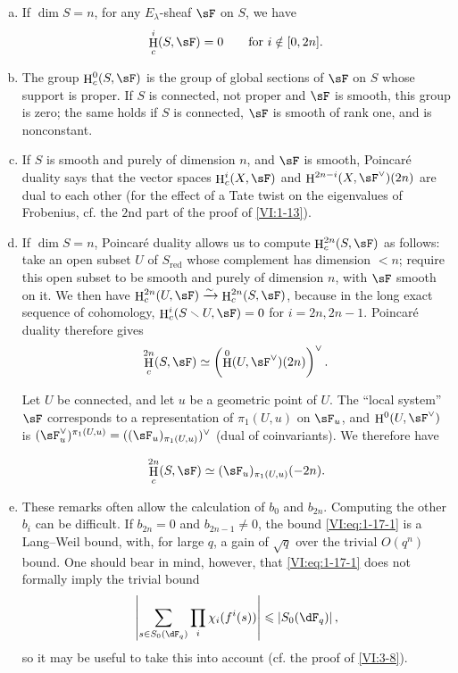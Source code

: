 \documentclass[oneside]{book}
\DeclareMathOperator{\h}{H}
\newcommand{\iso}{\xrightarrow\sim}
\renewcommand{\setminus}{\smallsetminus}
\theoremstyle{sga-source}
\theoremstyle{sga-source-dash}
\theoremstyle{sga-source-dotdash}
\theoremstyle{sga-source-number-note-dash}
\theoremstyle{sga-source-note-number-dotdash}
\theoremstyle{sga-source-example-dotdash}
\theoremstyle{sga-source-inline-number}
\theoremstyle{sga-source-bare-number}
\theoremstyle{sga-source}
\newcommand{\PrintPage}[1]{}\newcommand{\MathPage}[1]{}\newcommand{\PrintCite}[2]{#1}\newcommand{\var}[3]{#1}
\begin{document}
\begin{enumerate}[a)]
  \item If $\dim S=n$, for any $E_\lambda$-sheaf $\sF$ on $S$, we have 
    \[
      \h_c^i(S,\sF) = 0 \qquad \text{for $i\notin [0,2n]$.}
    \]
  \item The group $\h_c^0(S,\sF)$ is the group of global sections of $\sF$ 
    on $S$ whose support is proper. If $S$ is connected, not proper and 
    $\sF$ is smooth, this group is zero; the same holds if $S$ is connected, 
    $\sF$ is smooth of rank one, and is nonconstant.
  \item If $S$ is smooth and purely of dimension $n$, and $\sF$ is smooth, 
    Poincaré duality says that the vector spaces 
    \var{$\h_c^i(X,\sF)$ and $\h^{2n-i}(X,\sF^\vee)(2n)$}{$\h_c^i(S,\sF)$ and $\h^{2n-i}(S,\sF^\vee)(n)$}{S45-SOL-0707} are dual to each other 
    (for the effect of a Tate twist on the eigenvalues of Frobenius, 
    cf. the $2$nd part of the proof of \ref{VI:1-13}).
  \item If $\dim S=n$, Poincaré duality allows us to compute 
    $\h_c^{2n}(S,\sF)$ as follows: take an open subset $U$ of $S_\text{red}$ 
    whose complement has dimension $<n$; require this open subset to be smooth and 
    purely of dimension $n$, with $\sF$ smooth on it. We then have 
    $\h_c^{2n}(U,\sF) \iso \h_c^{2n}(S,\sF)$, because in the long exact sequence 
    of cohomology, $\h_c^i(S\setminus U,\sF) = 0$ for $i=2n,2n-1$. 
    Poincaré duality therefore gives 
    \[
      \h_c^{2n}(S,\sF) \simeq \left(\var{\h^0(U,\sF^\vee)(2n)}{\h^0(U,\sF^\vee)(n)}{S45-SOL-0710}\right)^\vee \text{.}
    \]
    
    Let $U$ be connected, and let $u$ be a geometric point of $U$. The 
    ``local system'' $\sF$ corresponds to a representation of 
    $\pi_1(U,u)$ on $\sF_u$, and $\h^0(U,\sF^\vee)$ is 
    $(\sF_u^\vee)^{\pi_1(U,u)}=((\sF_u)_{\pi_1(U,u)})^\vee$ (dual of 
    coinvariants). We therefore have 
    \PrintPage{179}
\[
      \h_c^{2n}(S,\sF) \simeq \var{(\sF_u)_{\pi_1(U,u)}(-2n)}{(\sF_u)_{\pi_1(U,u)}(-n)}{S45-SOL-0711} \text{.}
    \]
  \item These remarks often allow the calculation of $b_0$ and $b_{2n}$. 
    Computing the other $b_i$ can be difficult. If $b_{2n}=0$ and 
    $b_{2n-1}\ne 0$, the bound \eqref{VI:eq:1-17-1} is a Lang--Weil bound, 
    with, for large $q$, a gain of $\sqrt q$ over the 
    trivial $O(q^n)$ bound. One should bear in mind, however, that 
    \eqref{VI:eq:1-17-1} does not formally imply the trivial bound 
    \[
      \left|\sum_{s\in S_0(\dF_q)} \prod_i \chi_i(f^i(s))\right| \leqslant \left| S_0(\dF_q)\right| \text{,}
    \]
    so it may be useful to take this into account (cf. the proof of \ref{VI:3-8}). 
\end{enumerate}
\end{document}
